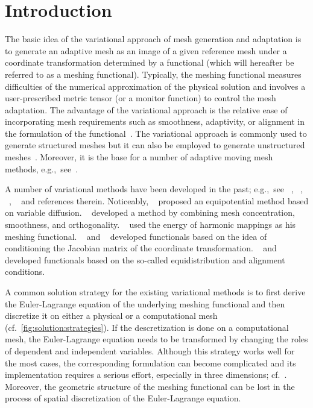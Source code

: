 \documentclass[american]{scrartcl}
\providecommand{\acite}[1]{\citeauthor{#1}~\cite{#1}}
\theoremstyle{remark}
\begin{document}
\section{Introduction}
\label{sect:introduction}
The basic idea of the variational approach of mesh generation and adaptation is to generate an adaptive mesh as an image of a given reference mesh under a coordinate transformation determined by a functional (which will hereafter be referred to as a meshing functional).
Typically, the meshing functional measures difficulties of the numerical approximation of the physical solution and involves a user-prescribed metric tensor (or a monitor function) to control the mesh adaptation.
The advantage of the variational approach is the relative ease of incorporating mesh requirements such as smoothness, adaptivity, or alignment in the formulation of the functional~\cite{BS82}.
The variational approach is commonly used to generate structured meshes but it can also be employed to generate unstructured meshes~\cite{CHR99b}.
Moreover, it is the base for a number of adaptive moving mesh methods, e.g.,\ see~\cite{HR11,HR99,HRR94a,LTZ01}.

A number of variational methods have been developed in the past; e.g.,\ see \acite{TWM85}, \acite{KS94}, \acite{Lis99}, \acite{HR11} and references therein.
Noticeably, \acite{Win81} proposed an equipotential method based on variable diffusion.
\acite{BS82} developed a method by combining mesh concentration, smoothness, and orthogonality.
\acite{Dvi91} used the energy of harmonic mappings as his meshing functional.
\acite{Knu96} and \acite{KR00} developed functionals based on the idea of conditioning the Jacobian matrix of the coordinate transformation. 
\acite{Hua01b} and \acite{HR11} developed functionals based on the so-called equidistribution and alignment conditions.

A common solution strategy for the existing variational methods is to first derive the Euler-Lagrange equation of the underlying meshing functional and then discretize it on either a physical or a computational mesh (cf.~\cref{fig:solution:strategies}).
If the descretization is done on a computational mesh, the Euler-Lagrange equation needs to be transformed by changing the roles of dependent and independent variables.
Although this strategy works well for the most cases, the corresponding formulation can become complicated and its implementation requires a serious effort, especially in three dimensions; cf.~\cite[Chapt.~6]{HR11}.
Moreover, the geometric structure of the meshing functional can be lost in the process of spatial discretization of the Euler-Lagrange equation.
\end{document}

